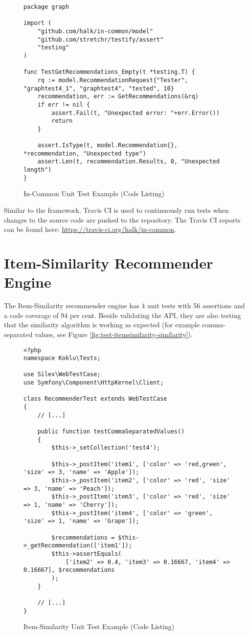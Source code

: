 \begin{figure}[!ht]
    \begin{verbatim}
package graph

import (
    "github.com/halk/in-common/model"
    "github.com/stretchr/testify/assert"
    "testing"
)

func TestGetRecommendations_Empty(t *testing.T) {
    rq := model.RecommendationRequest{"Tester", "graphtest4_1", "graphtest4", "tested", 10}
    recommendation, err := GetRecommendations(&rq)
    if err != nil {
        assert.Fail(t, "Unexpected error: "+err.Error())
        return
    }

    assert.IsType(t, model.Recommendation{}, *recommendation, "Unexpected type")
    assert.Len(t, recommendation.Results, 0, "Unexpected length")
}
    \end{verbatim}
    \caption{In-Common Unit Test Example (Code Listing)}
    \label{fig:testing-incommon-recommendation-query}
\end{figure}

Similar to the framework, Travis CI is used to continuously run tests when changes to the source code are pushed to the repository. The Travis CI reports can be found here: \url{https://travis-ci.org/halk/in-common}.

\section{Item-Similarity Recommender Engine}

The Item-Similarity recommender engine has 4 unit tests with 56 assertions and a code coverage of 94 per cent. Beside validating the API, they are also testing that the similarity algorithm is working as expected (for example comma-separated values, see Figure \ref{fig:test-itemsimilarity-similarity}).

\begin{figure}[!ht]
    \begin{verbatim}
<?php
namespace Koklu\Tests;

use Silex\WebTestCase;
use Symfony\Component\HttpKernel\Client;

class RecommenderTest extends WebTestCase
{
    // [...]

    public function testCommaSeparatedValues()
    {
        $this->_setCollection('test4');

        $this->_postItem('item1', ['color' => 'red,green', 'size' => 3, 'name' => 'Apple']);
        $this->_postItem('item2', ['color' => 'red', 'size' => 3, 'name' => 'Peach']);
        $this->_postItem('item3', ['color' => 'red', 'size' => 1, 'name' => 'Cherry']);
        $this->_postItem('item4', ['color' => 'green', 'size' => 1, 'name' => 'Grape']);

        $recommendations = $this->_getRecommendation(['item1']);
        $this->assertEquals(
            ['item2' => 0.4, 'item3' => 0.16667, 'item4' => 0.16667], $recommendations
        );
    }

    // [...]
}
    \end{verbatim}
    \caption{Item-Similarity Unit Test Example (Code Listing)}
    \label{fig:testing-itemsimilarity-similarity}
\end{figure}

